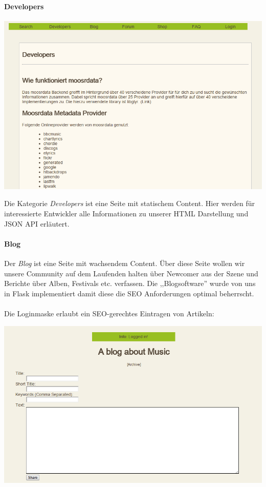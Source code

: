 \newpage
\paragraph{Developers}
\label{static_page}
\begin{center}
\includegraphics[width=\textwidth]{../screenshots/developers.png}
\end{center}

Die Kategorie \emph{Developers} ist eine Seite mit statischem Content. Hier
werden für interessierte Entwickler alle Informationen zu unserer HTML
Darstellung und JSON API erläutert.

\paragraph{Blog}
Der \emph{Blog} ist eine Seite mit wachsendem Content. Über diese Seite wollen
wir unsere Community auf dem Laufenden halten über Newcomer aus der Szene und
Berichte über Alben, Festivals etc. verfassen. Die ,,Blogsoftware'' wurde von
uns in Flask implementiert damit diese die SEO Anforderungen optimal beherrscht.
\\
\\
Die Loginmaske erlaubt ein SEO-gerechtes Eintragen von Artikeln:
\begin{center}
\includegraphics[width=\textwidth]{../screenshots/post_entry.png}
\end{center}

